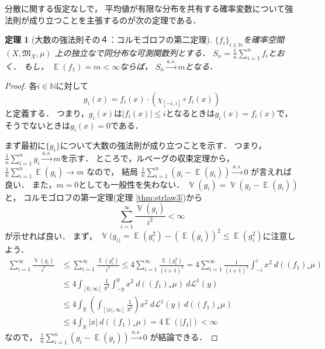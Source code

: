 \documentclass[leqno, a4paper, 12pt]{jsarticle}
\newtheorem{thm}{定理}
\newcommand{\nn}{\mathbb{N}}
\newcommand{\rr}{\mathbb{R}}
\DeclareMathOperator{\mean}{\mathbb{E}}
\DeclareMathOperator{\varian}{\mathbb{V}}
\begin{document}
分散に関する仮定なしで，
平均値が有限な分布を共有する確率変数について強法則が成り立つことを主張するのが次の定理である．
\begin{thm}[大数の強法則その４：コルモゴロフの第二定理]
\label{thm:strlaw4}
$\{f_i\}_{i\in \nn}$を確率空間
$(X, \mathfrak{M}_X, \mu)$
上の独立なで同分布な可測関数列とする．
$S_{n}=\frac{1}{n}\sum_{i=1}^nf_{i}$とおく．
もし，
$\mean(f_1)=m<\infty$ならば，
$S_n\xrightarrow{a. s. }m$となる．
\end{thm}
\begin{proof}
各$i\in \nn$に対して
\[
g_i(x)=f_i(x)\cdot \left(\chi_{[-i, i]}\circ f_{i}(x)\right)
\]
と定義する．
つまり，$g_{i}(x)$は$|f_{i}(x)|\le i$となるときは$g_{i}(x)=f_{i}(x)$で，そうでないときは$g_{i}(x)=0$である．

まず最初に$\{g_i\}$について大数の強法則が成り立つことを示す．
つまり，
$\frac{1}{n}\sum_{i=1}^ng_{i}\xrightarrow{a. s.}m$を示す．
ところで，ルベーグの収束定理から，
$\frac{1}{n}\sum_{i=1}^n\mean(g_{i})\to m$
なので，
結局
$\frac{1}{n}\sum_{i=1}^n(g_i-\mean(g_i))\xrightarrow{a. s. }0$
が言えれば良い．
また，$m=0$としても一般性を失わない．
$\varian(g_{i})=\varian(g_{i}-\mean(g_{i}))$と，
コルモゴロフの第一定理(定理 \ref{thm:strlaw3})から
\[
\sum_{i=1}^{\infty}\frac{\varian(g_i)}{i^2}<\infty
\]
が示せれば良い．
まず，
$\varian(g_{i)}=\mean(g_{i}^{2})-(\mean(g_{i}))^{2}\le 
\mean(g_{i}^{2})$に注意しよう．
\begin{align*}
\sum_{i=1}^{\infty}\frac{\varian(g_i)}{i^2}
&\le 
\sum_{i=1}^{\infty}\frac{\mean(g_i^2)}{i^2}
\le 
4\sum_{i=1}^{\infty}\frac{\mean(g_i^2)}{(i+1)^2}
=
4\sum_{i=1}^{\infty}\frac{1}{(i+1)^2}\int_{-i}^{i}x^2\ d((f_1)_{*}\mu)\\
&\le 
4\int_{[0, \infty]}\frac{1}{y^2}\int_{-y}^{y}x^2\ 
d((f_1)_{*}\mu)\ d\mathcal{L}^1(y)\\
&\le 
4\int_{\rr}\left(\int_{[|x|, \infty]}\frac{1}{y^2}\right)x^2\ d\mathcal{L}^1(y)
\ d((f_1)_{*}\mu)\\
&\le 
4\int_{\rr}|x|\ d((f_1)_{*}\mu)=4\mean(|f_1|)<\infty
\end{align*}
なので，
$\frac{1}{n}\sum_{i=1}^n(g_i-\mean(g_i))\xrightarrow{a. s. }0$
が結論できる．


\end{proof}
\end{document}
